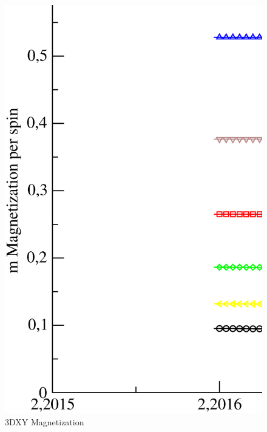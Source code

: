 



\begin{figure}[!htpb]
  \centering
  \includegraphics[width=\textwidth]{./plots/3DXY/vsT/Magnetization.eps}
  \caption{3DXY Magnetization}
\end{figure}

